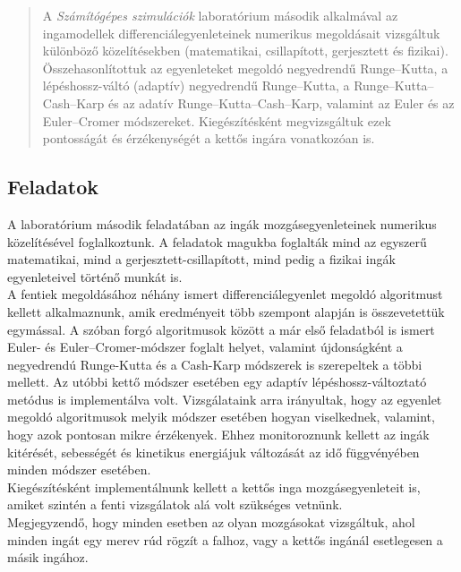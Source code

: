 \begin{abstract}
    \noindent A \emph{Számítógépes szimulációk} laboratórium második alkalmával az ingamodellek differenciálegyenleteinek numerikus megoldásait vizsgáltuk különböző közelítésekben (matematikai, csillapított, gerjesztett és fizikai). Összehasonlítottuk az egyenleteket megoldó negyedrendű Runge--Kutta, a lépéshossz-váltó (adaptív) negyedrendű Runge--Kutta, a Runge--Kutta--Cash--Karp és az adatív Runge--Kutta--Cash--Karp, valamint az Euler és az Euler--Cromer módszereket. Kiegészítésként megvizsgáltuk ezek pontosságát és érzékenységét a kettős ingára vonatkozóan is. \\
\end{abstract}

\begin{multicols}{2}

\section{Feladatok} \label{sec:1}
A laboratórium második feladatában az ingák mozgásegyenleteinek numerikus közelítésével foglalkoztunk. A feladatok magukba foglalták mind az egyszerű matematikai, mind a gerjesztett-csillapított, mind pedig a fizikai ingák egyenleteivel történő munkát is. \\
A fentiek megoldásához néhány ismert differenciálegyenlet megoldó algoritmust kellett alkalmaznunk, amik eredményeit több szempont alapján is összevetettük egymással. A szóban forgó algoritmusok között a már első feladatból is ismert Euler- és Euler--Cromer-módszer foglalt helyet, valamint újdonságként a negyedrendú Runge-Kutta és a Cash-Karp módszerek is szerepeltek a többi mellett. Az utóbbi kettő módszer esetében egy adaptív lépéshossz-változtató metódus is implementálva volt. Vizsgálataink arra irányultak, hogy az egyenlet megoldó algoritmusok melyik módszer esetében hogyan viselkednek, valamint, hogy azok pontosan mikre érzékenyek. Ehhez monitoroznunk kellett az ingák kitérését, sebességét és kinetikus energiájuk változását az idő függvényében minden módszer esetében. \\
Kiegészítésként implementálnunk kellett a kettős inga mozgásegyenleteit is, amiket szintén a fenti vizsgálatok alá volt szükséges vetnünk. \\
Megjegyzendő, hogy minden esetben az olyan mozgásokat vizsgáltuk, ahol minden ingát egy merev rúd rögzít a falhoz, vagy a kettős ingánál esetlegesen a másik ingához.


\end{multicols}
